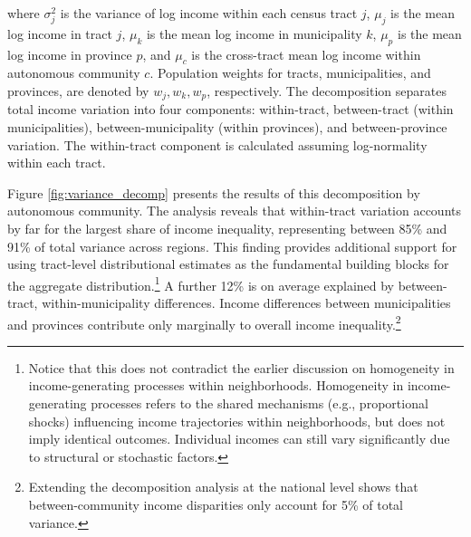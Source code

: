 where $\sigma^2_{j}$ is the variance of log income within each census tract $j$, $\mu_j$ is the mean log income in tract $j$, $\mu_k$ is the mean log income in municipality $k$, $\mu_p$ is the mean log income in province $p$, and  $\mu_{c}$ is the cross-tract mean log income within autonomous community $c$. Population weights for tracts, municipalities, and provinces, are denoted by $w_j, w_k, w_p$, respectively. The decomposition separates total income variation into four components: within-tract, between-tract (within municipalities), between-municipality (within provinces), and between-province variation. The within-tract component is calculated assuming log-normality within each tract.

Figure \ref{fig:variance_decomp} presents the results of this decomposition by autonomous community. The analysis reveals that within-tract variation accounts by far for the largest share of income inequality, representing between 85\% and 91\% of total variance across regions. This finding provides additional support for using tract-level distributional estimates as the fundamental building blocks for the aggregate distribution.\footnote{Notice that this does not contradict the earlier discussion on homogeneity in income-generating processes within neighborhoods. Homogeneity in income-generating processes refers to the shared mechanisms (e.g., proportional shocks) influencing income trajectories within neighborhoods, but does not imply identical outcomes. Individual incomes can still vary significantly due to structural or stochastic factors.} A further 12\% is on average explained by between-tract, within-municipality differences. Income differences between municipalities and provinces contribute only marginally to overall income inequality.\footnote{Extending the decomposition analysis at the national level shows that between-community income disparities only account for 5\% of total variance.}

